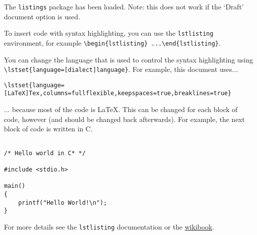 The \texttt{listings} package has been loaded. Note: this does not work if the `Draft' document option is used.

To insert code with syntax highlighting, you can use the \texttt{lstlisting} environment, for example \verb+\begin{lstlisting} ...\end{lstlisting}+.

You can change the language that is used to control the syntax highlighting using \verb+\lstset{language=[dialect]language}+. For example, this document uses...

\begin{lstlisting}
\lstset{language=[LaTeX]Tex,columns=fullflexible,keepspaces=true,breaklines=true}
\end{lstlisting}

... because most of the code is LaTeX. This can be changed for each block of code, however (and should be changed back afterwards). For example, the next block of code is written in C.

\lstset{language=c}
\begin{lstlisting}

/* Hello world in C* */

#include <stdio.h>

main()
{
    printf("Hello World!\n");
}
\end{lstlisting}

\lstset{language=[LaTeX]Tex}

For more details see the \texttt{lstlisting} documentation or the \href{https://en.wikibooks.org/wiki/LaTeX/Source_Code_Listings}{wikibook}.